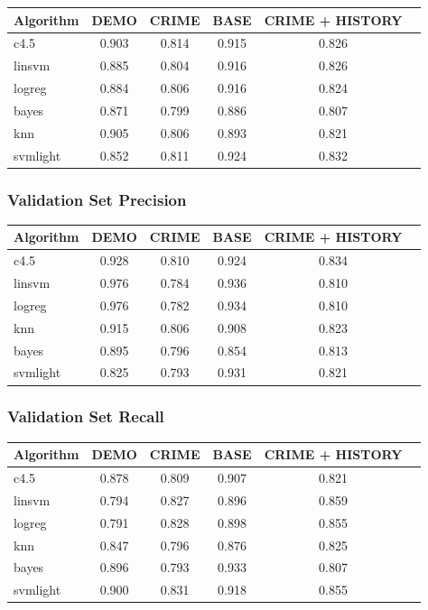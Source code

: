 \documentclass[11pt,letter]{article}
\begin{document}
\begin{tabular}{|l|c|c|c|c|c|}
\hline
Algorithm & DEMO & CRIME & BASE & CRIME + HISTORY\\
\hline
c4.5     & 0.903 & 0.814 & 0.915 & 0.826 \\
linsvm   & 0.885 & 0.804 & 0.916 & 0.826 \\
logreg   & 0.884 & 0.806 & 0.916 & 0.824 \\
bayes    & 0.871 & 0.799 & 0.886 & 0.807 \\
knn   & 0.905 & 0.806 & 0.893 & 0.821 \\
svmlight & 0.852 & 0.811 & 0.924 & 0.832 \\
\hline
\end{tabular}

\subsubsection{Validation Set Precision}

\begin{tabular}{|l|c|c|c|c|c|}
\hline
Algorithm & DEMO & CRIME & BASE & CRIME + HISTORY\\
\hline
c4.5     & 0.928 & 0.810 & 0.924 & 0.834 \\
linsvm   & 0.976 & 0.784 & 0.936 & 0.810 \\
logreg   & 0.976 & 0.782 & 0.934 & 0.810 \\
knn   & 0.915 & 0.806 & 0.908 & 0.823 \\
bayes    & 0.895 & 0.796 & 0.854 & 0.813 \\
svmlight & 0.825 & 0.793 & 0.931 & 0.821 \\
\hline
\end{tabular}

\subsubsection{Validation Set Recall}

\begin{tabular}{|l|c|c|c|c|c|}
\hline
Algorithm & DEMO & CRIME & BASE & CRIME + HISTORY\\
\hline
c4.5     & 0.878 & 0.809 & 0.907 & 0.821 \\
linsvm   & 0.794 & 0.827 & 0.896 & 0.859 \\
logreg   & 0.791 & 0.828 & 0.898 & 0.855 \\
knn   & 0.847 & 0.796 & 0.876 & 0.825 \\
bayes    & 0.896 & 0.793 & 0.933 & 0.807 \\
svmlight & 0.900 & 0.831 & 0.918 & 0.855 \\
\hline
\end{tabular}
\end{document}
